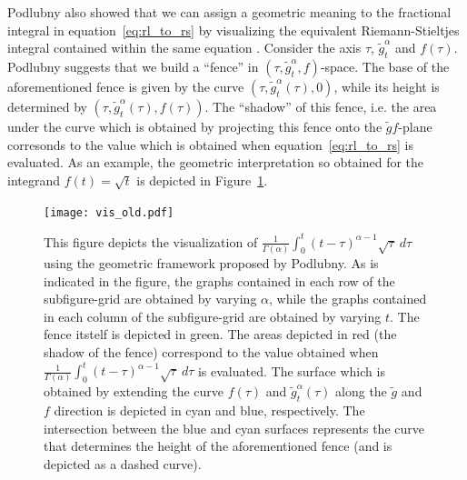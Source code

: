\documentclass[twoside,reqno,11pt]{fcaa-var} %
\begin{document}
\noindent
Podlubny also showed that we can assign a geometric meaning to the fractional integral in equation~\eqref{eq:rl_to_rs} by visualizing the equivalent Riemann-Stieltjes integral contained within the same equation \cite{bullock88,podlubny02}. Consider the axis $\tau$, $\widetilde{g}_t^{\alpha}$ and $f(\tau)$. Podlubny suggests that we build a ``fence'' in $(\tau,\widetilde{g}_t^{\alpha},f)$-space. The base of the aforementioned fence is given by the curve $(\tau,\widetilde{g}_t^{\alpha}(\tau),0)$, while its height is determined by $(\tau,\widetilde{g}_t^{\alpha}(\tau),f(\tau))$. The ``shadow'' of this fence, i.e. the area under the curve which is obtained by projecting this fence onto the $\widetilde{g}f$-plane corresonds to the value which is obtained when equation~\eqref{eq:rl_to_rs} is evaluated. As an example, the geometric interpretation so obtained for the integrand $f(t)=\sqrt{t}$ is depicted in Figure~\ref{fig:vis_old}.



\begin{figure}[htb]
\centering
\texttt{[image: vis\_old.pdf]}
\caption{This figure depicts the visualization of $\frac{1}{\Gamma(\alpha)}\int_{0}^{t}(t-\tau)^{\alpha-1}\sqrt{\tau}~d\tau$ using the geometric framework proposed by Podlubny.
As is indicated in the figure, the graphs contained in each row of the subfigure-grid are obtained by varying $\alpha$, while the graphs contained in each column of the subfigure-grid are obtained by varying $t$. The fence itstelf is depicted in green. The areas depicted in red (the shadow of the fence) correspond to the value obtained when $\frac{1}{\Gamma(\alpha)}\int_{0}^{t}(t-\tau)^{\alpha-1}\sqrt{\tau}~d\tau$ is evaluated.  The surface which is obtained by extending the curve $f(\tau)$ and $\widetilde{g}_t^{\alpha}(\tau)$ along the $\widetilde{g}$ and $f$ direction is depicted in cyan and blue, respectively. The intersection between the blue and cyan 
surfaces represents the curve that determines the height of the aforementioned fence (and is depicted as a dashed curve).   
}
\label{fig:vis_old}
\end{figure}
\end{document}
